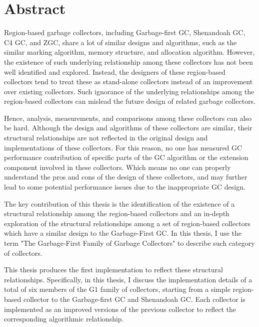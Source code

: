 \chapter*{Abstract}
\vspace{-1em}


Region-based garbage collectors, including Garbage-first GC, Shenandoah GC, C4 GC, and ZGC,
share a lot of similar designs and algorithms, such as
the similar marking algorithm, memory structure, and allocation algorithm.
However, the existence of such underlying relationship among these collectors
has not been well identified and explored.
Instead, the designers of these region-based collectors tend to treat these as
stand-alone collectors instead of an improvement over existing collectors.
Such ignorance of the underlying relationships among the region-based collectors
can mislead the future design of related garbage collectors. 

Hence, analysis, measurements, and comparisons among these collectors can also be hard.
Although the design and algorithms of these collectors are similar,
their structural relationships are not reflected in the
original design and implementations of these collectors.
For this reason, no one has measured
GC performance contribution of specific parts of the GC algorithm or the extension component involved
in these collectors.
Which means no one can properly understand the pros and cons
of the design of these collectors, and may further lead to some potential performance
issues due to the inappropriate GC design.


The key contribution of this thesis is the identification of the existence of a
structural relationship among the region-based collectors and an in-depth exploration
of the structural relationships among a set of region-based collectors which have a similar
design to the Garbage-First GC. In this thesis, I use the term
"The Garbage-First Family of Garbage Collectors" to describe such category of collectors.

This thesis produces the first implementation to reflect these structural relationships.
Specifically, in this thesis, I discuss the implementation details of a total of six members of the G1 family
of collectors, starting from a simple region-based
collector to the Garbage-first GC and Shenandoah GC.
Each collector is implemented as an improved versions of the previous collector to reflect
the corresponding algorithmic relationship.

